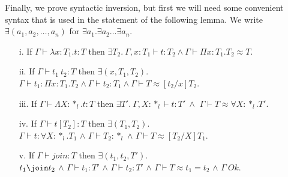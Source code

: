 \noindent
Finally, we prove syntactic inversion, but first we will need some
convenient syntax that is used in the statement of the following
lemma.  We write $\exists (a_1,a_2,\ldots,a_n)$ for $\exists
a_1.\exists a_2\ldots\exists a_n$.
\begin{lemma}
  \label{lemma:inversion_ssfe}
  \begin{itemize}\itemsep2pt
  \item[i.] If $\Gamma \vdash \lambda x:T_1.t:T$
    then $\exists T_2.\ \Gamma,x:T_1 \vdash t:T_2 \land 
    \Gamma \vdash \Pi x:T_1.T_2 \approx T$.

  \item[ii.] If $\Gamma \vdash t_1\ t_2:T$ then $\exists (x,T_1, T_2).$\\
    $\Gamma \vdash t_1:\Pi x:T_1.T_2 \land
    \Gamma \vdash t_2:T_1 \land \Gamma \vdash T \approx
     [t_2/x]T_2$.

  \item[iii.] If $\Gamma \vdash \Lambda X:*_l.t:T$
    then $\exists T'.\ \Gamma,X:*_l \vdash t:T'\ \land $
    $\Gamma \vdash T \approx \forall X:*_l.T'$.

  \item[iv.] If $\Gamma \vdash t[T_2]:T$ then 
    $\exists (T_1, T_2)$. \\
    $\Gamma \vdash t:\forall X:*_l.T_1$ $\land$
    $\Gamma \vdash T_2:*_l$ $\land$ 
    $\Gamma \vdash T \approx [T_2/X]T_1$.

  \item[v.] If $\Gamma \vdash join:T$ then
    $\exists (t_1,t_2,T')$.\\
    $t_1 \join t_2$ $\land$
    $\Gamma \vdash t_1:T'$ $\land$
    $\Gamma \vdash t_2:T'$ $\land$
    $\Gamma \vdash T \approx t_1 = t_2$ $\land$
    $\Gamma\ Ok$.
  \end{itemize}
\end{lemma}
